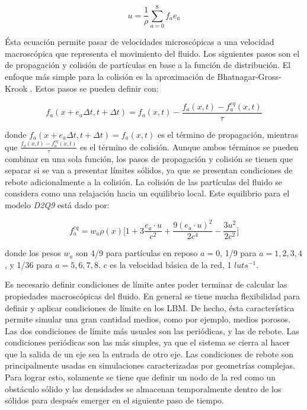 \begin{equation}
	u = \frac{1}{\rho} \sum_{a=0}^8 f_a e_a
\end{equation}

Ésta ecuación permite pasar de velocidades microscópicas a una velocidad macroscópica que representa el movimiento del fluido. Los siguientes pasos son el de propagación y colisión de partículas en base a la función de distribución. El enfoque más simple para la colisión es la aproximación de Bhatnagar-Gross-Krook \citep{sukop2006lattice}. Estos pasos se pueden definir con:

\begin{equation}
	f_a(x+e_a \Delta t, t + \Delta t) = f_a(x,t) - \frac{f_a(x,t) - f_a^{eq}(x,t)}{\tau}
\end{equation}

donde $f_a(x+e_a \Delta t, t + \Delta t) = f_a(x,t)$ es el término de propagación, mientras que $\frac{f_a(x,t) - f_a^{eq}(x,t)}{\tau}$ es el término de colisión. Aunque ambos términos se pueden combinar en una sola función, los pasos de propagación y colisión se tienen que separar si se van a presentar límites sólidos, ya que se presentan condiciones de rebote adicionalmente a la colisión. La colisión de las partículas del fluido se considera como una relajación hacia un equilibrio local. Este equilibrio para el modelo \textit{D2Q9} está dado por:

\begin{equation}
	f_a^{eq} = w_a \rho (x) \bigg[ 1 + 3 \frac{e_a \cdot u}{c^2} + \frac{9(e_a \cdot u)^2}{2 c^4} - \frac{3 u^2}{2 c^2} \bigg]
\end{equation}

donde los pesos $w_a$ son 4/9 para partículas en reposo $a=0$, 1/9 para $a=1,2,3,4$, y 1/36 para $a=5,6,7,8$. $c$ es la velocidad básica de la red, 1 $lu ts^{-1}$. 

Es necesario definir condiciones de límite antes poder terminar de calcular las propiedades macroscópicas del fluido. En general se tiene mucha flexibilidad para definir y aplicar condiciones de límite en los LBM. De hecho, ésta característica permite simular una gran cantidad medios, como por ejemplo, medios porosos. Las dos condiciones de límite más usuales son las periódicas, y las de rebote. Las condiciones periódicas son las más simples, ya que el sistema se cierra al hacer que la salida de un eje sea la entrada de otro eje. Las condiciones de rebote son principalmente usadas en simulaciones caracterizadas por geometrías complejas. Para lograr esto, solamente se tiene que definir un nodo de la red como un obstáculo sólido y las densidades se almacenan temporalmente dentro de los sólidos para después emerger en el siguiente paso de tiempo.

